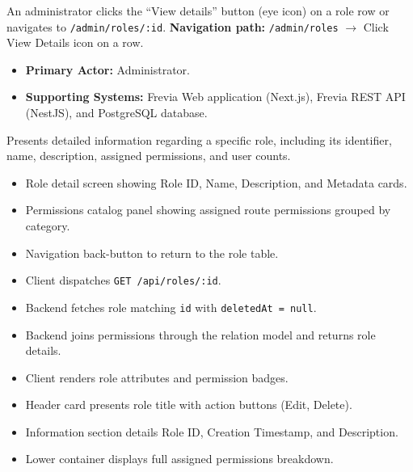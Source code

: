 An administrator clicks the ``View details'' button (eye icon) on a role row or navigates to \texttt{/admin/roles/:id}.\newline
\textbf{Navigation path:} \texttt{/admin/roles} $\rightarrow$ Click View Details icon on a row.


\begin{itemize}[leftmargin=1.6em,topsep=3pt,itemsep=2pt,parsep=0pt,label=$\bullet$]
    \item \textbf{Primary Actor:} Administrator.
    \item \textbf{Supporting Systems:} Frevia Web application (Next.js), Frevia REST API (NestJS), and PostgreSQL database.
\end{itemize}

\noindent Presents detailed information regarding a specific role, including its identifier, name, description, assigned permissions, and user counts.

\begin{itemize}[leftmargin=1.6em,topsep=3pt,itemsep=2pt,parsep=0pt,label=$\bullet$]
    \item Role detail screen showing Role ID, Name, Description, and Metadata cards.
    \item Permissions catalog panel showing assigned route permissions grouped by category.
    \item Navigation back-button to return to the role table.
\end{itemize}

\begin{itemize}[leftmargin=1.6em,topsep=3pt,itemsep=2pt,parsep=0pt,label=$\bullet$]
    \item Client dispatches \texttt{GET /api/roles/:id}.
    \item Backend fetches role matching \texttt{id} with \texttt{deletedAt = null}.
    \item Backend joins permissions through the relation model and returns role details.
    \item Client renders role attributes and permission badges.
\end{itemize}

\begin{itemize}[leftmargin=1.6em,topsep=3pt,itemsep=2pt,parsep=0pt,label=$\bullet$]
    \item Header card presents role title with action buttons (Edit, Delete).
    \item Information section details Role ID, Creation Timestamp, and Description.
    \item Lower container displays full assigned permissions breakdown.
\end{itemize}

